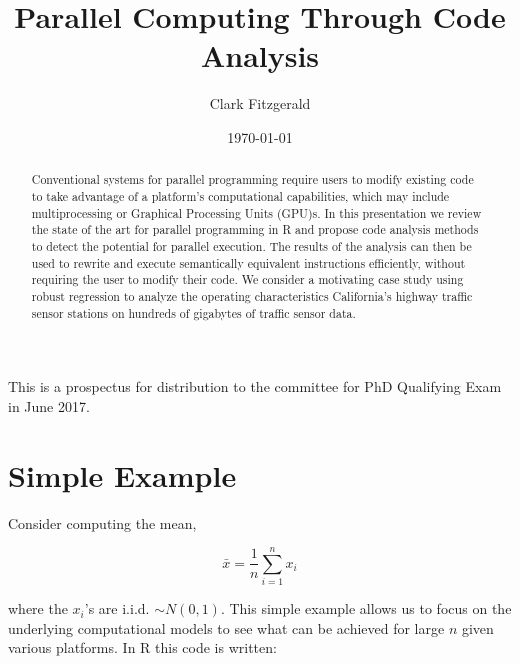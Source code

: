 \documentclass[12pt]{article}
\begin{document}
\title{Parallel Computing Through Code Analysis}
\date{\today}
\author{Clark Fitzgerald}
\maketitle

\begin{abstract}

    Conventional systems for parallel programming require users to modify
    existing code to take advantage of a platform's computational
    capabilities, which may include multiprocessing or Graphical Processing
    Units (GPU)s. In this presentation we review the state of the art for
    parallel programming in R and propose code analysis methods to detect
    the potential for parallel execution. The results of the analysis can
    then be used to rewrite and execute semantically equivalent
    instructions efficiently, without requiring the user to modify their
    code. We consider a motivating case study using robust regression to
    analyze the operating characteristics California's highway traffic
    sensor stations on hundreds of gigabytes of traffic sensor data.

\end{abstract}

This is a prospectus for distribution to the committee for PhD
Qualifying Exam in June 2017.


\section{Simple Example}


Consider computing the mean,

\begin{equation}
    \bar{x} = \frac{1}{n} \sum_{i = 1}^n x_i
\label{eq:mean}
\end{equation}

where the $x_i$'s are
i.i.d. $\sim N(0, 1)$. This simple example allows us to focus on the
underlying computational models to see what can be achieved for large $n$
given various platforms. In R this code is written:
\end{document}
